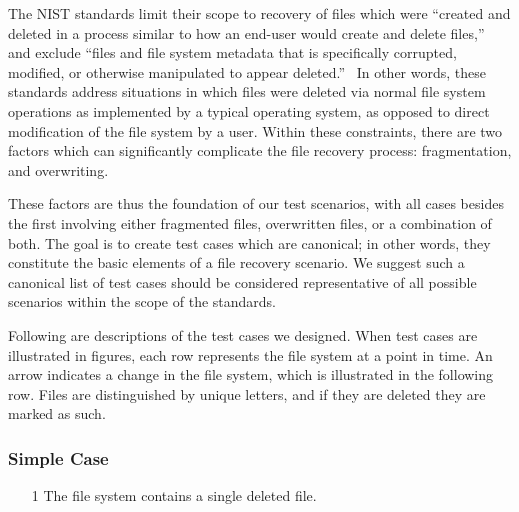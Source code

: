 The NIST standards limit their scope to recovery of files which were ``created and deleted in a process similar to how an end-user would create and delete files,''~\cite{meta:dfr:standards} and exclude ``files and file system metadata that is specifically corrupted, modified, or otherwise manipulated to appear deleted.''~\cite{meta:dfr:standards}
In other words, these standards address situations in which files were deleted via normal file system operations as implemented by a typical operating system, as opposed to direct modification of the file system by a user.
Within these constraints, there are two factors which can significantly complicate the file recovery process: 
fragmentation, and overwriting. 

These factors are thus the foundation of our test scenarios, with all cases besides the first involving either fragmented files, overwritten files, or a combination of both. 
The goal is to create test cases which are canonical; in other words, they constitute the basic elements of a file recovery scenario.
We suggest such a canonical list of test cases should be considered representative of all possible scenarios within the scope of the standards.

Following are descriptions of the test cases we designed. When test cases are illustrated in figures, each row represents the file system at a point in time. An arrow indicates a change in the file system, which is illustrated in the following row. Files are distinguished by unique letters, and if they are deleted they are marked as such.
\subsubsection{Simple Case}
\begin{itemize}
    \item [1] The file system contains a single deleted file.
\end{itemize}

